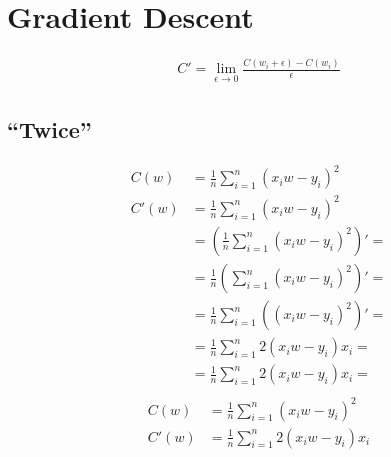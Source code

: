 \documentclass{article}
\begin{document}
\section{Gradient Descent}


\begin{align}
  C' = \lim_{\epsilon \to 0}\frac{C(w_i + \epsilon) - C(w_i)}{\epsilon}
\end{align}

\subsection{``Twice''}
\begin{align}
    C(w) &= \frac{1}{n}{\sum_{i=1}^{n}(x_iw - y_i)^2} \\
    C'(w) &= \frac{1}{n}{\sum_{i=1}^{n}(x_iw - y_i)^2} \\
          &= \left(\frac{1}{n}{\sum_{i=1}^{n}(x_iw - y_i)^2}\right)'= \\
          &= \frac{1}{n}\left(\sum_{i=1}^{n}(x_iw - y_i)^2\right)'  = \\
          &= \frac{1}{n}\sum_{i=1}^{n}\left((x_iw - y_i)^2\right)'  = \\
          &= \frac{1}{n}\sum_{i=1}^{n}2(x_iw - y_i)x_i  = \\
          &= \frac{1}{n}\sum_{i=1}^{n}2(x_iw - y_i)x_i  = \\
\end{align}
\begin{align}
  C(w)  &= \frac{1}{n}{\sum_{i=1}^{n}(x_iw - y_i)^2} \\
  C'(w) &= \frac{1}{n}\sum_{i=1}^{n}2(x_iw - y_i)x_i  \\
\end{align}
\end{document}
